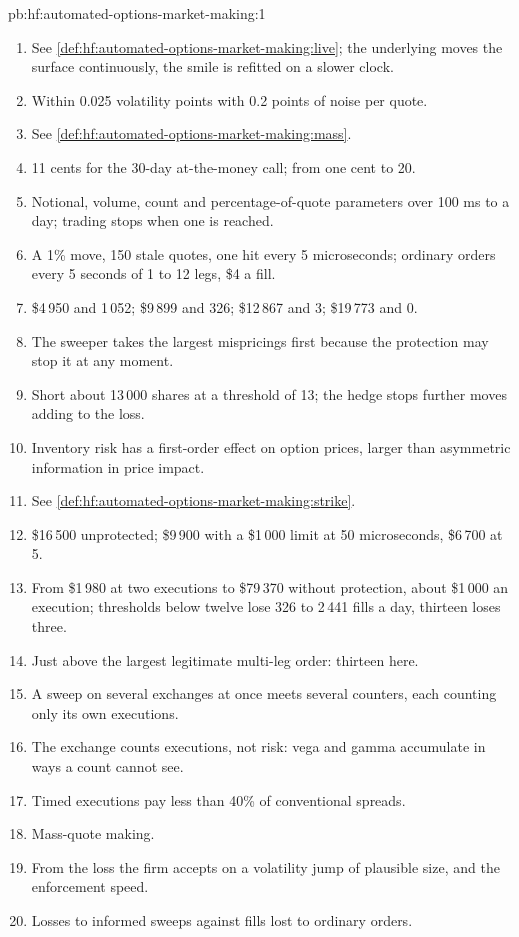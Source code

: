 \begin{solution}{pb:hf:automated-options-market-making:1}
\begin{enumerate}
\item See \cref{def:hf:automated-options-market-making:live}; the underlying moves the surface continuously, the smile is refitted on a slower clock.
\item Within 0.025 volatility points with 0.2 points of noise per quote.
\item See \cref{def:hf:automated-options-market-making:mass}.
\item 11 cents for the 30-day at-the-money call; from one cent to 20.
\item Notional, volume, count and percentage-of-quote parameters over 100 ms to a day; trading stops when one is reached.
\item A 1\% move, 150 stale quotes, one hit every 5 microseconds; ordinary orders every 5 seconds of 1 to 12 legs, \$4 a fill.
\item \$4\,950 and 1\,052; \$9\,899 and 326; \$12\,867 and 3; \$19\,773 and 0.
\item The sweeper takes the largest mispricings first because the protection may stop it at any moment.
\item Short about 13\,000 shares at a threshold of 13; the hedge stops further moves adding to the loss.
\item Inventory risk has a first-order effect on option prices, larger than asymmetric information in price impact.
\item See \cref{def:hf:automated-options-market-making:strike}.
\item \$16\,500 unprotected; \$9\,900 with a \$1\,000 limit at 50 microseconds, \$6\,700 at 5.
\item From \$1\,980 at two executions to \$79\,370 without protection, about \$1\,000 an execution; thresholds below twelve lose 326 to 2\,441 fills a day,
thirteen loses three.
\item Just above the largest legitimate multi-leg order: thirteen here.
\item A sweep on several exchanges at once meets several counters, each counting only its own executions.
\item The exchange counts executions, not risk: vega and gamma accumulate in ways a count cannot see.
\item Timed executions pay less than 40\% of conventional spreads.
\item Mass-quote making.
\item From the loss the firm accepts on a volatility jump of plausible size, and the enforcement speed.
\item Losses to informed sweeps against fills lost to ordinary orders.
\end{enumerate}
\end{solution}

